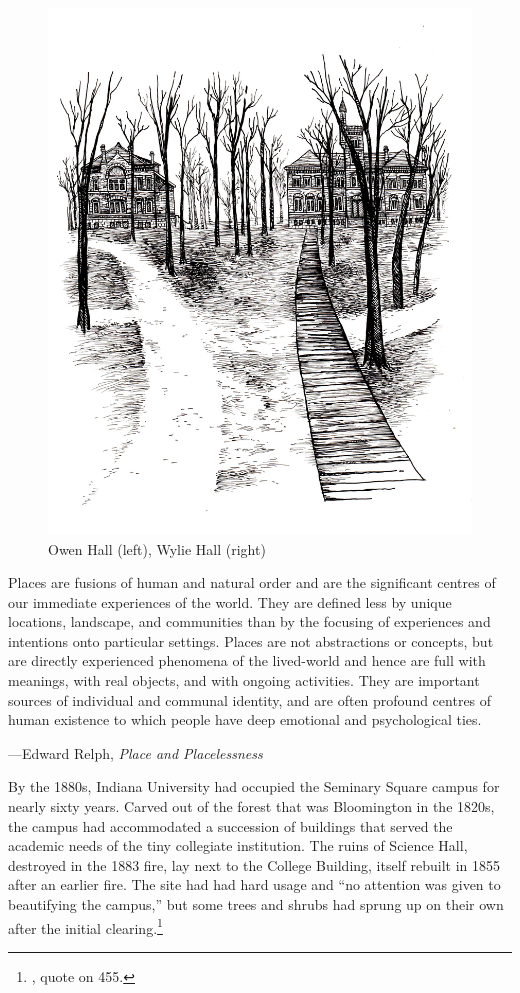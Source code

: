 \documentclass[
  american,
  letterpaper,
]{scrreprt}
\begin{document}
\begin{figure}[H]

{\centering \includegraphics[width=0.6\linewidth,height=\textheight,keepaspectratio]{images/miu4.jpeg}

}

\caption{Owen Hall (left), Wylie Hall (right)}

\end{figure}%

\epigraph{
Places are fusions of human and natural order and are the significant centres of our immediate experiences of the world. They are defined less by unique locations, landscape, and communities than by the focusing of experiences and intentions onto particular settings. Places are not abstractions or concepts, but are directly experienced phenomena of the lived-world and hence are full with meanings, with real objects, and with ongoing activities. They are important sources of individual and communal identity, and are often profound centres of human existence to which people have deep emotional and psychological ties. 
}
{---Edward Relph, \textit{Place and Placelessness}}

By the 1880s, Indiana University had occupied the Seminary Square campus
for nearly sixty years. Carved out of the forest that was Bloomington in
the 1820s, the campus had accommodated a succession of buildings that
served the academic needs of the tiny collegiate institution. The ruins
of Science Hall, destroyed in the 1883 fire, lay next to the College
Building, itself rebuilt in 1855 after an earlier fire. The site had had
hard usage and ``no attention was given to beautifying the campus,'' but
some trees and shrubs had sprung up on their own after the initial
clearing.\footnote{, quote on 455.}
\end{document}
